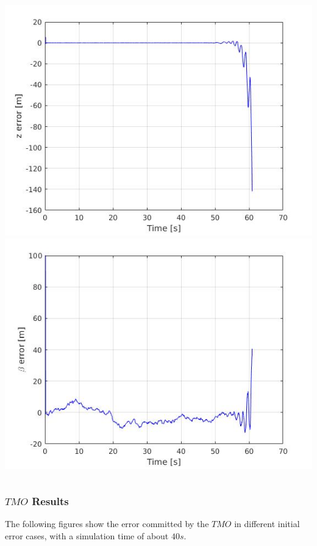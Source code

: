 \documentclass{beamer}
\begin{document}
\begin{frame}
\begin{columns}[t]
			\includegraphics[scale=0.2]{z_div.jpg}\\
			\includegraphics[scale=0.2]{beta_div.jpg}
		\end{columns}
		
	\end{frame}

	\begin{frame}
		\frametitle{$TMO$ Results}
		The following figures show the error committed by the $TMO$ in different initial error cases, with a simulation time of about $40s$.
	\end{frame}
\end{document}
